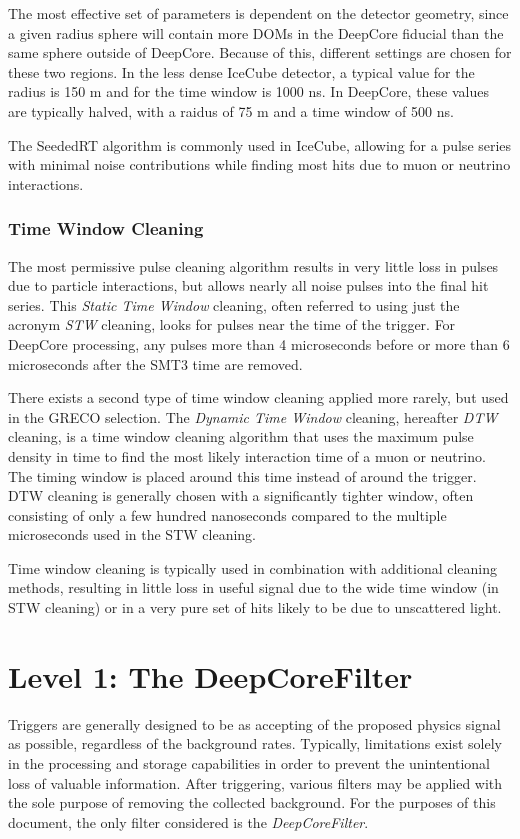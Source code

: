 The most effective set of parameters is dependent on the detector geometry, since a given radius sphere will contain more DOMs in the DeepCore fiducial than the same sphere outside of DeepCore.
Because of this, different settings are chosen for these two regions.
In the less dense IceCube detector, a typical value for the radius is 150 m and for the time window is 1000 ns. 
In DeepCore, these values are typically halved, with a raidus of 75 m and a time window of 500 ns.

The SeededRT algorithm is commonly used in IceCube, allowing for a pulse series with minimal noise contributions while finding most hits due to muon or neutrino interactions.

\subsubsection{Time Window Cleaning}
The most permissive pulse cleaning algorithm results in very little loss in pulses due to particle interactions, but allows nearly all noise pulses into the final hit series.
This \emph{Static Time Window} cleaning, often referred to using just the acronym \emph{STW} cleaning, looks for pulses near the time of the trigger.
For DeepCore processing, any pulses more than 4 microseconds before or more than 6 microseconds after the SMT3 time are removed.

There exists a second type of time window cleaning applied more rarely, but used in the GRECO selection.
The \emph{Dynamic Time Window} cleaning, hereafter \emph{DTW} cleaning, is a time window cleaning algorithm that uses the maximum pulse density in time to find the most likely interaction time of a muon or neutrino. 
The timing window is placed around this time instead of around the trigger.
DTW cleaning is generally chosen with a significantly tighter window, often consisting of only a few hundred nanoseconds compared to the multiple microseconds used in the STW cleaning.

Time window cleaning is typically used in combination with additional cleaning methods, resulting in little loss in useful signal due to the wide time window (in STW cleaning) or in a very pure set of hits likely to be due to unscattered light.

\label{sec:DeepCoreFilter}
\section{Level 1: The DeepCoreFilter}
Triggers are generally designed to be as accepting of the proposed physics signal as possible, regardless of the background rates.
Typically, limitations exist solely in the processing and storage capabilities in order to prevent the unintentional loss of valuable information.
After triggering, various filters may be applied with the sole purpose of removing the collected background.
For the purposes of this document, the only filter considered is the \emph{DeepCoreFilter}.

